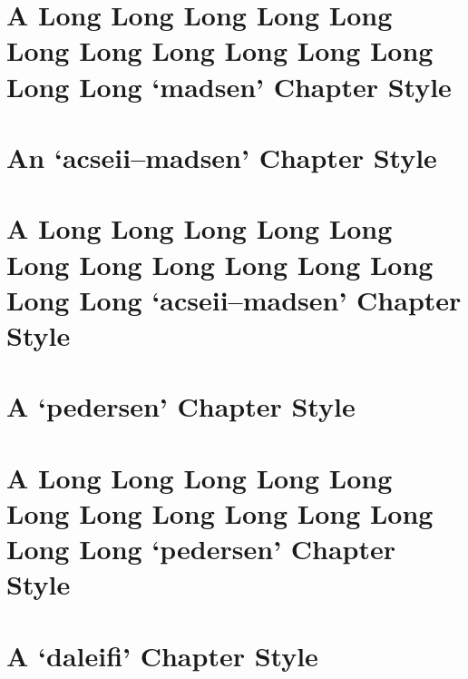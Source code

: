 \documentclass[10pt,a4paper,extrafontsizes,oldfontcommands,oneside]{memoir}
\begin{document}

\chapter{A Long Long Long Long Long Long Long Long Long Long Long Long Long `madsen' Chapter Style} %
\label{chap:a_long_madsen_chapter_style}


\chapter{An `acseii--madsen' Chapter Style} %
\label{chap:a_acseii_chapter_style}


\chapter{A Long Long Long Long Long Long Long Long Long Long Long Long Long `acseii--madsen' Chapter Style} %
\label{chap:a_long_acseii_chapter_style}


\chapter{A `pedersen' Chapter Style} %
\label{chap:a_pedersen_chapter_style}



\chapter{A Long Long Long Long Long Long Long Long Long Long Long Long Long `pedersen' Chapter Style} %
\label{chap:a_long_pedersen_chapter_style}



\chapter{A `daleifi' Chapter Style} %
\label{chap:a_daleifi_chapter_style}

\end{document}
